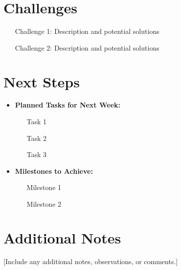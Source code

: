 \documentclass[12pt]{article}
\begin{document}
\section*{Challenges}
\begin{itemize}
    \item [Challenge 1: Description and potential solutions]
    \item [Challenge 2: Description and potential solutions]
\end{itemize}

\section*{Next Steps}
\begin{itemize}
    \item \textbf{Planned Tasks for Next Week:}
    \begin{itemize}
        \item [Task 1]
        \item [Task 2]
        \item [Task 3]
    \end{itemize}
    \item \textbf{Milestones to Achieve:}
    \begin{itemize}
        \item [Milestone 1]
        \item [Milestone 2]
    \end{itemize}
\end{itemize}

\section*{Additional Notes}
[Include any additional notes, observations, or comments.]
\end{document}
